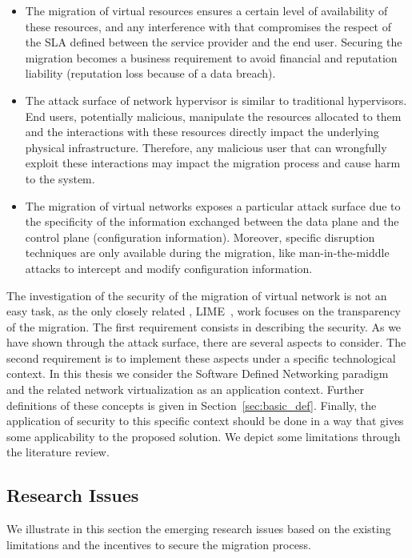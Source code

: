 \begin{itemize}
    
    \item The migration of virtual resources ensures a certain level of availability of these resources, and any interference with that compromises the respect of the SLA defined between the service provider and the end user.
    Securing the migration becomes a business requirement to avoid financial and reputation liability (\eg reputation loss because of a data breach).
    
    \item The attack surface of network hypervisor is similar to traditional hypervisors. End users, potentially malicious, manipulate the resources allocated to them and the interactions with these resources directly impact the underlying physical infrastructure. Therefore, any malicious user that can wrongfully exploit these interactions may impact the migration process and cause harm to the system.

    \item The migration of virtual networks exposes a particular attack surface due to the specificity of the information exchanged between the data plane and the control plane (\eg configuration information). Moreover, specific disruption techniques are only available during the migration, like man-in-the-middle attacks to intercept and modify configuration information.  
\end{itemize}

The investigation of the security of the migration of virtual network is not an easy task, as the only closely related , LIME~\cite{Lime-Ghorbani2014}, work focuses on the transparency of the migration. The first requirement consists in describing the security. As we have shown through the attack surface, there are several aspects to consider. The second requirement is to implement these aspects under a specific technological context. In this thesis we consider the Software Defined Networking paradigm and the related network virtualization as an application context. Further definitions of these concepts is given in Section~\ref{sec:basic_def}. Finally, the application of security to this specific context should be done in a way that gives some applicability to the proposed solution. We depict some limitations through the literature review.


\subsection{Research Issues}
We illustrate in this section the emerging research issues based on the existing limitations and the incentives to secure the migration process.

